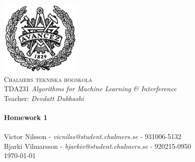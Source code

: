 
\begin{titlepage}
\begin{center}


~\\[1.0cm]
 \includegraphics[width=0.3\textwidth]{Figures/chalmers.png}~\\[1.0cm]

\textsc{\LARGE Chalmers tekniska högskola}\\[0.3cm]
TDA231 \textit{Algorithms for Machine Learning \& Interference}\\
Teacher: \textit{Devdatt Dubhashi} \\

\HRule \\[0.3cm]
{ \huge \bfseries Homework 1 \\[0.3cm] }
\HRule \\[0.3cm]

Victor Nilsson  -  \textit{vicnilss@student.chalmers.se} - 931006-5132\\ [0.3cm]
Bjarki Vilmarsson  -  \textit{bjarkiv@student.chalmers.se} - 920215-0950\\ [0.3cm]


\vfill
{\large \today}

\end{center}
\end{titlepage}

\newpage